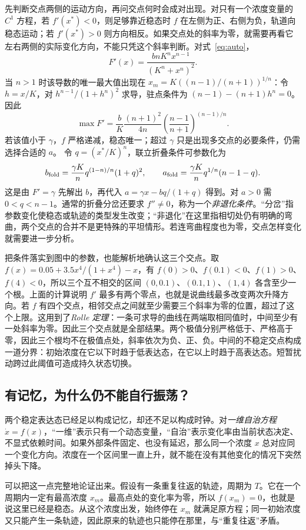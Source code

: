 \documentclass[11pt,a4paper,UTF8,fontset=fandol]{ctexart}
\begin{document}
先判断交点两侧的运动方向，再问交点何时会成对出现。对只有一个浓度变量的 $C^1$ 方程，若 $f'(x^*)<0$，则足够靠近稳态时 $f$ 在左侧为正、右侧为负，轨道向稳态运动；若 $f'(x^*)>0$ 则方向相反。如果交点处的斜率为零，就需要再看它左右两侧的实际变化方向，不能只凭这个斜率判断。对式~\eqref{eq:auto}，
\[
F'(x)=\frac{bnK^nx^{n-1}}{(K^n+x^n)^2}.
\]
当 $n>1$ 时该导数的唯一最大值出现在 $x_m=K((n-1)/(n+1))^{1/n}$：令 $h=x/K$，对 $h^{n-1}/(1+h^n)^2$ 求导，驻点条件为 $(n-1)-(n+1)h^n=0$。因此
\[
\max F'=\frac bK\frac{(n+1)^2}{4n}
\left(\frac{n-1}{n+1}\right)^{(n-1)/n}.
\]
若该值小于 $\gamma$，$f$ 严格递减，稳态唯一；超过 $\gamma$ 只是出现多交点的必要条件，仍需选择合适的 $a$。
令 $q=(x^*/K)^n$，联立折叠条件可参数化为
\[
b_{\rm fold}=\frac{\gamma K}{n}q^{(1-n)/n}(1+q)^2,\qquad
a_{\rm fold}=\frac{\gamma K}{n}q^{1/n}(n-1-q).
\]
这是由 $F'=\gamma$ 先解出 $b$，再代入 $a=\gamma x-bq/(1+q)$ 得到。对 $a>0$ 需 $0<q<n-1$。通常的折叠分岔还要求 $f''\ne0$，称为一个\emph{非退化条件}。“分岔”指参数变化使稳态或轨迹的类型发生改变；“非退化”在这里指相切处仍有明确的弯曲，两个交点的合并不是更特殊的平坦情形。若连弯曲程度也为零，交点怎样变化就需要进一步分析。

把条件落实到图中的参数，也能解析地确认这三个交点。取 $f(x)=0.05+3.5x^4/(1+x^4)-x$，有 $f(0)>0$、$f(0.1)<0$、$f(1)>0$、$f(4)<0$，所以三个互不相交的区间 $(0,0.1)$、$(0.1,1)$、$(1,4)$ 各含至少一个根。上面的计算说明 $f'$ 最多有两个零点，也就是说曲线最多改变两次升降方向。若 $f$ 有四个交点，相邻交点之间就至少需要三个斜率为零的位置，超过了这个上限。这用到了\emph{Rolle 定理}：一条可求导的曲线在两端取相同值时，中间至少有一处斜率为零。因此三个交点就是全部结果。两个极值分别严格低于、严格高于零，因此三个根均不在极值点处，斜率依次为负、正、负。中间的不稳定交点构成一道分界：初始浓度在它以下时趋于低表达态，在它以上时趋于高表达态。短暂扰动跨过此阈值可造成持久状态切换。

\subsection{有记忆，为什么仍不能自行振荡？}
两个稳定表达态已经足以构成记忆，却还不足以构成时钟。对\emph{一维自治方程} $\dot x=f(x)$，“一维”表示只有一个动态变量，“自治”表示变化率由当前状态决定、不显式依赖时间。如果外部条件固定、也没有延迟，那么同一个浓度 $x$ 总对应同一个变化方向。浓度在一个区间里一直上升，就不能在没有其他变化的情况下突然掉头下降。

可以把这一点完整地论证出来。假设有一条重复往返的轨迹，周期为 $T$。它在一个周期内一定有最高浓度 $x_m$。最高点处的变化率为零，所以 $f(x_m)=0$，也就是说这里已经是稳态。从这个浓度出发，始终停在 $x_m$ 就满足原方程；同一初始浓度又只能产生一条轨迹，因此原来的轨迹也只能停在那里，与“重复往返”矛盾。
\end{document}
